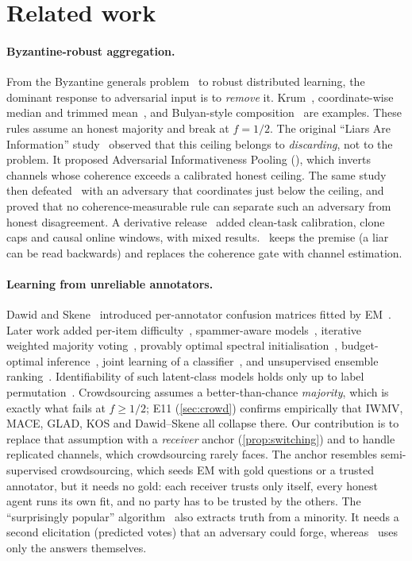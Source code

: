 \section{Related work}\label{sec:related}

\paragraph{Byzantine-robust aggregation.} From the Byzantine generals problem~\citep{lamport1982} to robust distributed learning, the dominant response to adversarial input is to \emph{remove} it. Krum~\citep{blanchard2017}, coordinate-wise median and trimmed mean~\citep{yin2018}, and Bulyan-style composition~\citep{guerraoui2018} are examples. These rules assume an honest majority and break at $f=1/2$. The original ``Liars Are Information'' study~\citep{das2026aip} observed that this ceiling belongs to \emph{discarding}, not to the problem. It proposed Adversarial Informativeness Pooling (\aip), which inverts channels whose coherence exceeds a calibrated honest ceiling. The same study then defeated \aip\ with an adversary that coordinates just below the ceiling, and proved that no coherence-measurable rule can separate such an adversary from honest disagreement. A derivative release~\citep{nabidnur2026bucket} added clean-task calibration, clone caps and causal online windows, with mixed results. \race\ keeps the premise (a liar can be read backwards) and replaces the coherence gate with channel estimation.

\paragraph{Learning from unreliable annotators.} Dawid and Skene~\citep{dawid1979} introduced per-annotator confusion matrices fitted by EM~\citep{dempster1977}. Later work added per-item difficulty~\citep{whitehill2009}, spammer-aware models~\citep{hovy2013}, iterative weighted majority voting~\citep{li2014iwmv}, provably optimal spectral initialisation~\citep{zhang2016}, budget-optimal inference~\citep{karger2014}, joint learning of a classifier~\citep{raykar2010}, and unsupervised ensemble ranking~\citep{parisi2014}. Identifiability of such latent-class models holds only up to label permutation~\citep{kruskal1977,allman2009}. Crowdsourcing assumes a better-than-chance \emph{majority}, which is exactly what fails at $f\ge1/2$; E11 (\cref{sec:crowd}) confirms empirically that IWMV, MACE, GLAD, KOS and Dawid--Skene all collapse there. Our contribution is to replace that assumption with a \emph{receiver} anchor (\cref{prop:switching}) and to handle replicated channels, which crowdsourcing rarely faces. The anchor resembles semi-supervised crowdsourcing, which seeds EM with gold questions or a trusted annotator, but it needs no gold: each receiver trusts only itself, every honest agent runs its own fit, and no party has to be trusted by the others. The ``surprisingly popular'' algorithm~\citep{prelec2017} also extracts truth from a minority. It needs a second elicitation (predicted votes) that an adversary could forge, whereas \race\ uses only the answers themselves.

